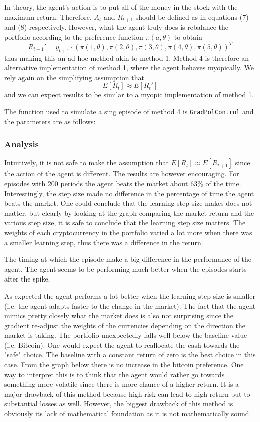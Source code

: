 \documentclass[a4paper,12pt]{article}
\newcommand{\code}[1]{\texttt{#1}}
\begin{document}
In theory, the agent's action is to put all of the money in the stock with the maximum return. Therefore, $A_t$ and $R_{t+1}$ should be defined as in equations (7) and (8) respectively. However, what the agent truly does is rebalance the portfolio according to the preference function $\pi(a,\theta)$ to obtain
\begin{equation}
R_{t+1}' = y_{t+1} \cdot (\pi(1,\theta),\pi(2,\theta),\pi(3,\theta),\pi(4,\theta),\pi(5,\theta))^T 
\end{equation}
thus making this an ad hoc method akin to method 1. Method 4 is therefore an alternative implementation of method 1, where the agent behaves myopically. We rely again on the simplifying assumption that 
$$E[R_t] \approx E[R_t']$$
and we can expect results to be similar to a myopic implementation of method 1.

The function used to simulate a sing episode of method 4 is \code{GradPolControl} and the parameters are as follows:

\subsubsection{Analysis}
Intuitively, it is not safe to make the assumption that $E[R_t] \approx E[R_{t+1}]$ since the action of the agent is different. The results are however encouraging. For episodes with 200 periods the agent beats the market about 63\% of the time. Interestingly, the step size made no difference in the percentage of time the agent beats the market. One could conclude that the learning step size makes does not matter, but clearly by looking at the graph comparing the market return and the various step size, it is safe to conclude that the learning step size matters. The weights of each cryptocurrency in the portfolio varied a lot more when there was a smaller learning step, thus there was a difference in the return. \par
The timing at which the episode make a big difference in the performance of the agent. The agent seems to be performing much better when the episodes starts after the spike. \par
As expected the agent performs a lot better when the learning step size is smaller (i.e. the agent adapts faster to the change in the market). The fact that the agent mimics pretty closely what the market does is also not surprising since the gradient re-adjust the weights of the currencies depending on the direction the market is taking. The portfolio unexpectedly falls well below the baseline value (i.e. Bitcoin). One would expect the agent to reallocate the cash towards the "safe" choice. The baseline with a constant return of zero is the best choice in this case. From the graph below there is no increase in the bitcoin preference. One way to interpret this is to think that the agent would rather go towards something more volatile since there is more chance of a higher return. It is a major drawback of this method because high risk can lead to high return but to substantial losses as well. However, the biggest drawback of this method is obviously its lack of mathematical foundation as it is not mathematically sound.
\end{document}
